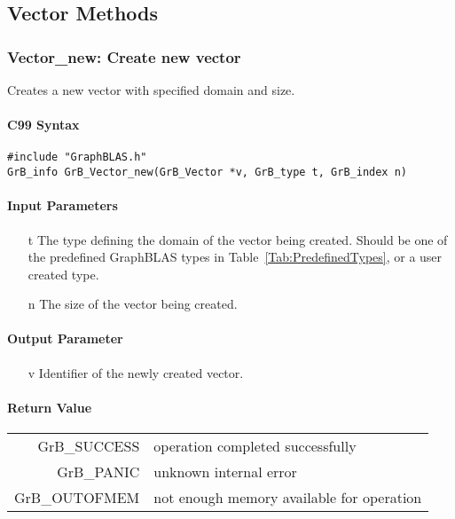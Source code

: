 \subsection{Vector Methods}


\subsubsection{{\sf Vector\_new}: Create new vector}

Creates a new vector with specified domain and size.

\paragraph{C99 Syntax}

\begin{verbatim}
#include "GraphBLAS.h"
GrB_info GrB_Vector_new(GrB_Vector *v, GrB_type t, GrB_index n)
\end{verbatim}

\paragraph{Input Parameters}

\begin{itemize}
	\item[{\sf t}] The type defining the domain of the vector being created. Should be one of the predefined
	GraphBLAS types in Table~\ref{Tab:PredefinedTypes}, or a user created type.
	\item[{\sf n}] The size of the vector being created.
\end{itemize}

\paragraph{Output Parameter}

\begin{itemize}
	\item[{\sf v}] Identifier of the newly created vector.
\end{itemize}

\paragraph{Return Value}

\begin{tabular}{rl} 
{\sf GrB\_SUCCESS} 	& operation completed successfully \\
{\sf GrB\_PANIC}	& unknown internal error \\
{\sf GrB\_OUTOFMEM}	& not enough memory available for operation \\
\end{tabular}

